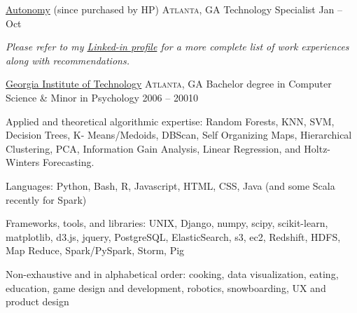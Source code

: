 \documentclass[10pt,a4paper]{article}
\begin{document}
\headedsection
  {\href{https://www.linkedin.com/company-beta/4014/}{Autonomy}{ (since purchased by HP)}}
  {\textsc{Atlanta, GA}} {%
  \headedsubsection
    {Technology Specialist}
    {Jan  -- Oct }
    {}
  }


\vspace{-0.2em}
\begin{center}
  \emph{\small Please refer to my \href{http://www.linkedin.com/in/jbmunro4}{Linked-in profile} for a more complete list of work experiences along with recommendations.}
\end{center}


\spacedhrule{-0.2em}{-0.4em}


\headedsection
  {\href{http://www.gatech.edu}{Georgia Institute of Technology}}
  {\textsc{Atlanta, GA}} {%
  \headedsubsection
    {Bachelor degree in Computer Science \& Minor in Psychology}
    {2006 -- 20010}
    {}
}


\spacedhrule{0.5em}{-0.4em}


\inlineheadsection  %
  {Applied and theoretical algorithmic expertise:}
  {Random Forests, KNN, SVM, Decision Trees, K- Means/Medoids, DBScan, Self Organizing Maps, Hierarchical Clustering, PCA, Information Gain Analysis, Linear Regression, and Holtz-Winters Forecasting.}

\vspace{0.5em}
\inlineheadsection
  {Languages:}
  {Python, Bash, R, Javascript, HTML, CSS, Java (and some Scala recently for Spark)}

\vspace{0.5em}
\inlineheadsection
  {Frameworks, tools, and libraries:}
  {UNIX, Django, numpy, scipy, scikit-learn, matplotlib, d3.js, jquery, PostgreSQL, ElasticSearch, s3, ec2, Redshift, HDFS, Map Reduce, Spark/PySpark, Storm, Pig}


\spacedhrule{1.6em}{-0.4em}


\inlineheadsection
  {Non-exhaustive and in alphabetical order:}
  {cooking, data visualization, eating, education, game design and development, robotics, snowboarding, UX and product design}
\end{document}

